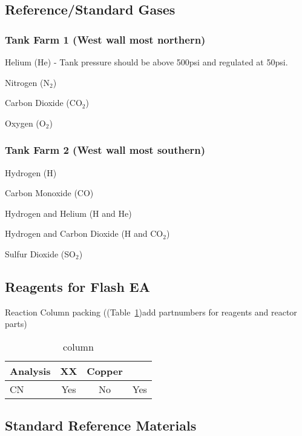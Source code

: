 \documentclass[12pt]{../SOP3_beta}\usepackage[]{graphicx}\usepackage[]{color}
\begin{document}
\subsection{Reference/Standard Gases}

\subsubsection{Tank Farm 1 (West wall most northern)}

\NP Helium (He) - Tank pressure should be above 500psi and regulated at 50psi.

\NP Nitrogen (N$_2$)

\NP Carbon Dioxide (CO$_2$)

\NP Oxygen (O$_2$)

\subsubsection{Tank Farm 2 (West wall most southern)}

\NP Hydrogen (H)

\NP Carbon Monoxide (CO)

\NP Hydrogen and Helium (H and He)

\NP Hydrogen and Carbon Dioxide (H and CO$_2$)

\NP Sulfur Dioxide (SO$_2$)

\subsection{Reagents for Flash EA}

\NP Reaction Column packing ((Table~\ref{column})add partnumbers for reagents and reactor parts)

\begin{table}[h]
\label{column}
\caption{column}
\centering
\begin{tabular}{lccc} \hline
Analysis      & XX    & Copper  & \\ \hline\hline
CN            & Yes   & No      & Yes \\ \hline


\end{tabular}
\end{table}

\subsection{Standard Reference Materials} \label{Standard Reference Materials}
\end{document}
